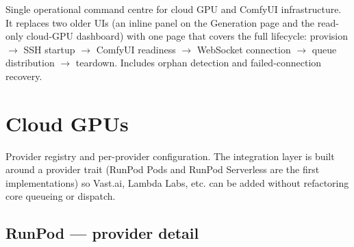 Single operational command centre for cloud GPU and ComfyUI infrastructure. It
replaces two older UIs (an inline panel on the Generation page and the
read-only cloud-GPU dashboard) with one page that covers the full lifecycle:
provision $\rightarrow$ SSH startup $\rightarrow$ ComfyUI readiness $\rightarrow$
WebSocket connection $\rightarrow$ queue distribution $\rightarrow$ teardown.
Includes orphan detection and failed-connection recovery.


\begin{itemize}
\end{itemize}

\section{Cloud GPUs}
\label{sec:admin-cloud-gpus}

Provider registry and per-provider configuration. The integration layer is
built around a provider trait (RunPod Pods and RunPod Serverless are the first
implementations) so Vast.ai, Lambda Labs, etc. can be added without refactoring
core queueing or dispatch.


\begin{itemize}
\end{itemize}

\subsection{RunPod — provider detail}

